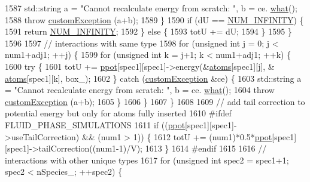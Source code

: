 \begin{DoxyCode}
1587                 std::string a = \textcolor{stringliteral}{"Cannot recalculate energy from scratch: "}, b = ce.
      \hyperlink{classcustom_exception_aeb6ab5848b038adfc68fde86a512f691}{what}();
1588                 \textcolor{keywordflow}{throw} \hyperlink{classcustom_exception}{customException} (a+b);
1589             \}
1590             \textcolor{keywordflow}{if} (dU == \hyperlink{potentials_8h_ab94ab1d09e2291d03fe92a0e24a9d33b}{NUM\_INFINITY}) \{
1591                 \textcolor{keywordflow}{return} \hyperlink{potentials_8h_ab94ab1d09e2291d03fe92a0e24a9d33b}{NUM\_INFINITY};
1592             \} \textcolor{keywordflow}{else} \{
1593                 totU += dU;
1594             \}
1595         \}
1596 
1597         \textcolor{comment}{// interactions with same type}
1598         \textcolor{keywordflow}{for} (\textcolor{keywordtype}{unsigned} \textcolor{keywordtype}{int} j = 0; j < num1+adj1; ++j) \{
1599             \textcolor{keywordflow}{for} (\textcolor{keywordtype}{unsigned} \textcolor{keywordtype}{int} k = j+1; k < num1+adj1; ++k) \{
1600                 \textcolor{keywordflow}{try} \{
1601                     totU += \hyperlink{classsim_system_ad2e290b5963f132e6a3a56cee35c8e9f}{ppot}[spec1][spec1]->energy(&\hyperlink{classsim_system_a90421b19082f7fb8fc23b7264b1161e4}{atoms}[spec1][j], &
      \hyperlink{classsim_system_a90421b19082f7fb8fc23b7264b1161e4}{atoms}[spec1][k], box\_);
1602                 \} \textcolor{keywordflow}{catch} (\hyperlink{classcustom_exception}{customException} &ce) \{
1603                     std::string a = \textcolor{stringliteral}{"Cannot recalculate energy from scratch: "}, b = ce.
      \hyperlink{classcustom_exception_aeb6ab5848b038adfc68fde86a512f691}{what}();
1604                     \textcolor{keywordflow}{throw} \hyperlink{classcustom_exception}{customException} (a+b);
1605                 \}
1606             \}
1607         \}
1608 
1609         \textcolor{comment}{// add tail correction to potential energy but only for atoms fully inserted}
1610 \textcolor{preprocessor}{#ifdef FLUID\_PHASE\_SIMULATIONS}
1611 \textcolor{preprocessor}{}        \textcolor{keywordflow}{if} ((\hyperlink{classsim_system_ad2e290b5963f132e6a3a56cee35c8e9f}{ppot}[spec1][spec1]->useTailCorrection) && (num1 > 1)) \{
1612             totU += (num1)*0.5*\hyperlink{classsim_system_ad2e290b5963f132e6a3a56cee35c8e9f}{ppot}[spec1][spec1]->tailCorrection((num1-1)/V);
1613         \}
1614 \textcolor{preprocessor}{#endif}
1615 \textcolor{preprocessor}{}
1616         \textcolor{comment}{// interactions with other unique types}
1617         \textcolor{keywordflow}{for} (\textcolor{keywordtype}{unsigned} \textcolor{keywordtype}{int} spec2 = spec1+1; spec2 < nSpecies\_; ++spec2) \{

\end{DoxyCode}

